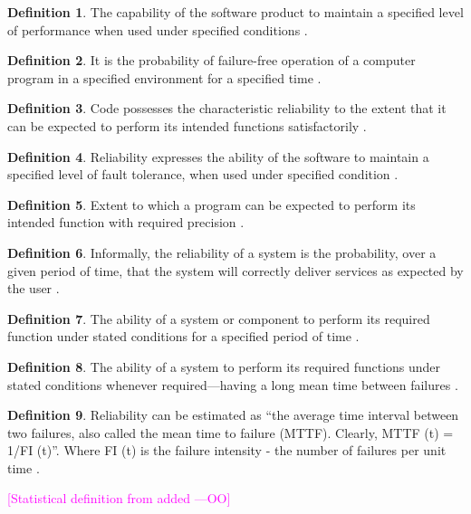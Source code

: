 \documentclass[letterpaper,cleveref]{lipics-v2019}
\newcommand{\authornote}[3]{\textcolor{#1}{[#3 ---#2]}}
\newcommand{\authornote}[3]{}
\newcommand{\oo}[1]{\authornote{magenta}{OO}{#1}} %
\theoremstyle{definition}
\newtheorem{defn}{Definition}
\begin{document}
\begin{defn}
 The capability of the software product to maintain a specified level of performance when used under specified conditions \cite{ISO9126}.
\end{defn}
\begin{defn} \label{reliabilitySelected1} It is the probability of failure-free
  operation of a computer program in a specified environment for a specified
  time \citep{musa1987software}.
\end{defn} 
    
\begin{defn}
  Code possesses the characteristic reliability to the extent that it can be
  expected to perform its intended functions satisfactorily
  \citep{boehm1976quantitative}.
\end{defn}

\begin{defn}
  Reliability expresses the ability of the software to maintain a specified
  level of fault tolerance, when used under specified condition
  \citep{singh2013different}.
\end{defn}

\begin{defn}
  Extent to which a program can be expected to perform its intended function
  with required precision \citep{McCallEtAl1977}.
\end{defn}

\begin{defn}
  Informally, the reliability of a system is the probability, over a given
  period of time, that the system will correctly deliver services as expected by
  the user \citep{sommerville}.
\end{defn}
	
\begin{defn}
  The ability of a system or component to perform its required function under
  stated conditions for a specified period of time
  \citep{IEEEComputerDictionary1991}.
\end{defn}

\begin{defn}
  The ability of a system to perform its required functions under stated
  conditions whenever required—having a long mean time between failures
  \citep{mcconnell2004code}.
\end{defn}
\begin{defn} \label{reliabilitySelected2} Reliability can be estimated as ``the
  average time interval between two failures, also called the mean time to
  failure (MTTF). Clearly, MTTF (t) = 1/FI (t)''. Where FI (t) is the failure
  intensity - the number of failures per unit time \citep{GhezziEtAl2003}.
\end{defn}
\oo{Statistical definition from  \citep{GhezziEtAl2003} added}
  
\end{document}
